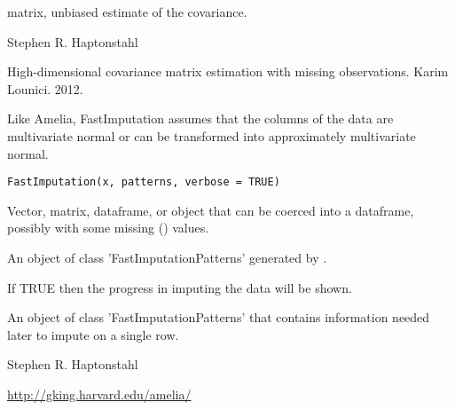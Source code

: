 \documentclass[a4paper]{book}
\begin{document}
%
\begin{Value}
matrix, unbiased estimate of the covariance.
\end{Value}
%
\begin{Author}\relax
Stephen R. Haptonstahl 
\end{Author}
%
\begin{References}\relax
High-dimensional covariance matrix estimation with missing observations.
Karim Lounici. 2012.
\end{References}
%
\begin{Description}\relax
Like Amelia, FastImputation assumes that the columns of the data are
multivariate normal or can be transformed into approximately
multivariate normal.
\end{Description}
%
\begin{Usage}
\begin{verbatim}
FastImputation(x, patterns, verbose = TRUE)
\end{verbatim}
\end{Usage}
%
\begin{Arguments}
\begin{ldescription}
\item[\code{x}] Vector, matrix, dataframe, or object that can be coerced into a dataframe, possibly with some missing () values.

\item[\code{patterns}] An object of class 'FastImputationPatterns' generated by .

\item[\code{verbose}] If TRUE then the progress in imputing the data will be shown.
\end{ldescription}
\end{Arguments}
%
\begin{Value}
An object of class 'FastImputationPatterns' that contains
information needed later to impute on a single row.
\end{Value}
%
\begin{Author}\relax
Stephen R. Haptonstahl 
\end{Author}
%
\begin{References}\relax
\url{http://gking.harvard.edu/amelia/}
\end{References}
%
\begin{SeeAlso}\relax
{}
\end{SeeAlso}
\end{document}
